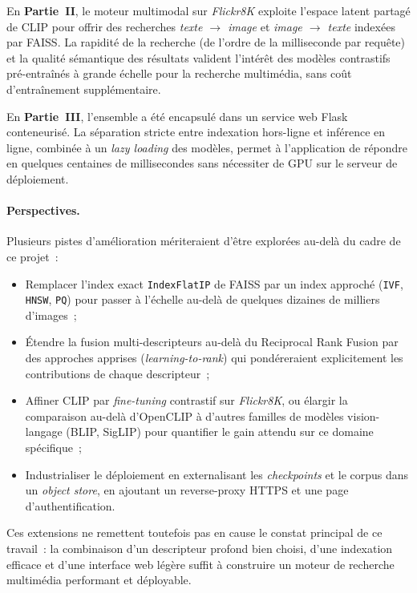\documentclass[a4paper,11pt]{article}
\begin{document}
En \textbf{Partie~II}, le moteur multimodal sur \textit{Flickr8K}
exploite l'espace latent partagé de CLIP pour offrir des recherches
\textit{texte $\to$ image} et \textit{image $\to$ texte} indexées par
FAISS. La rapidité de la recherche (de l'ordre de la milliseconde par
requête) et la qualité sémantique des résultats valident l'intérêt des
modèles contrastifs pré-entraînés à grande échelle pour la recherche
multimédia, sans coût d'entraînement supplémentaire.

En \textbf{Partie~III}, l'ensemble a été encapsulé dans un service web
Flask conteneurisé. La séparation stricte entre indexation hors-ligne
et inférence en ligne, combinée à un \textit{lazy loading} des modèles,
permet à l'application de répondre en quelques centaines de
millisecondes sans nécessiter de GPU sur le serveur de déploiement.

\paragraph{Perspectives.}
Plusieurs pistes d'amélioration mériteraient d'être explorées au-delà
du cadre de ce projet~:
\begin{itemize}
    \item Remplacer l'index exact \texttt{IndexFlatIP} de FAISS par un
    index approché (\texttt{IVF}, \texttt{HNSW}, \texttt{PQ}) pour
    passer à l'échelle au-delà de quelques dizaines de milliers
    d'images~;

    \item Étendre la fusion multi-descripteurs au-delà du Reciprocal
    Rank Fusion par des approches apprises (\textit{learning-to-rank})
    qui pondéreraient explicitement les contributions de chaque
    descripteur~;

    \item Affiner CLIP par \textit{fine-tuning} contrastif sur
    \textit{Flickr8K}, ou élargir la comparaison au-delà d'OpenCLIP à
    d'autres familles de modèles vision-langage (BLIP, SigLIP) pour
    quantifier le gain attendu sur ce domaine spécifique~;

    \item Industrialiser le déploiement en externalisant les
    \textit{checkpoints} et le corpus dans un \textit{object store},
    en ajoutant un reverse-proxy HTTPS et une page d'authentification.
\end{itemize}
Ces extensions ne remettent toutefois pas en cause le constat principal
de ce travail~: la combinaison d'un descripteur profond bien choisi,
d'une indexation efficace et d'une interface web légère suffit à
construire un moteur de recherche multimédia performant et déployable.

\newpage
\printbibliography
\end{document}
